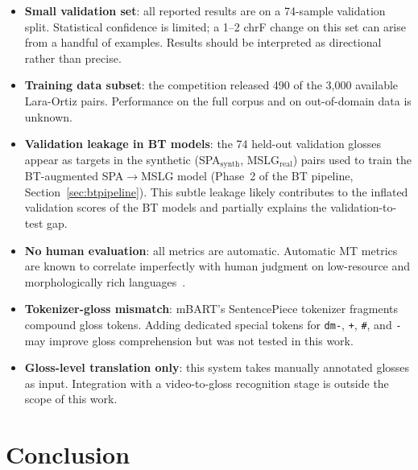 \documentclass[sigconf,screen]{ceurart}
\begin{document}
\begin{itemize}
  \item \textbf{Small validation set}: all reported results are on a
        74-sample validation split. Statistical confidence is limited;
        a 1--2 chrF change on this set can arise from a handful of
        examples. Results should be interpreted as directional rather
        than precise.
  \item \textbf{Training data subset}: the competition released 490
        of the 3,000 available Lara-Ortiz pairs. Performance on the
        full corpus and on out-of-domain data is unknown.
  \item \textbf{Validation leakage in BT models}: the 74 held-out
        validation glosses appear as targets in the synthetic
        (SPA$_{\text{synth}}$, MSLG$_{\text{real}}$) pairs used to
        train the BT-augmented SPA$\!\to\!$MSLG model (Phase~2 of
        the BT pipeline, Section~\ref{sec:btpipeline}).
        This subtle leakage likely contributes to the inflated
        validation scores of the BT models and partially explains
        the validation-to-test gap.
  \item \textbf{No human evaluation}: all metrics are automatic.
        Automatic MT metrics are known to correlate imperfectly with
        human judgment on low-resource and morphologically rich
        languages~\cite{popovic2015chrf}.
  \item \textbf{Tokenizer-gloss mismatch}: mBART's SentencePiece
        tokenizer fragments compound gloss tokens. Adding dedicated
        special tokens for \texttt{dm-}, \texttt{+}, \texttt{\#},
        and \texttt{-} may improve gloss comprehension but was not
        tested in this work.
  \item \textbf{Gloss-level translation only}: this system takes
        manually annotated glosses as input. Integration with a
        video-to-gloss recognition stage is outside the scope of
        this work.
\end{itemize}

\section{Conclusion}
\label{sec:conclusion}
\end{document}
